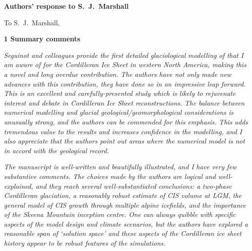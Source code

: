 


\textbf{Authors' response to S.~J.~Marshall}
\bigskip


\newcommand{\sechead}[1]{\bigskip\noindent\textbf{#1}}
\newcommand{\referee}[1]{\bigskip\textcolor{journalname}{\textit{#1}}}
\newcommand{\msquote}[1]{\begin{quote}\textit{#1}\end{quote}}

To S.~J.~Marshall,


\sechead{1 \quad Summary comments}

\referee{%
    Seguinot and colleagues provide the first detailed glaciological modelling
    of that I am aware of for the Cordilleran Ice Sheet in western North
    America, making this a novel and long overdue contribution. The authors
    have not only made new advances with this contribution, they have done so
    in an impressive leap forward. This is an excellent and carefully-presented
    study which is likely to rejuvenate interest and debate in Cordilleran Ice
    Sheet reconstructions. The balance between numerical modelling and glacial
    geological/geomorphological considerations is unusually strong, and the
    authors can be commended for this emphasis. This adds tremendous value to
    the results and increases confidence in the modelling, and I also
    appreciate that the authors point out areas where the numerical model is
    not in accord with the geological record.}

\referee{%
    The manuscript is well-written and beautifully illustrated, and I have very
    few substantive comments. The choices made by the authors are logical and
    well-explained, and they reach several well-substantiated conclusions: a
    two-phase Cordilleran glaciation, a reasonably robust estimate of CIS
    volume at LGM, the general model of CIS growth through multiple alpine
    icefields, and the importance of the Skeena Mountain inception centre. One
    can always quibble with specific aspects of the model design and climate
    scenarios, but the authors have explored a reasonable span of `solution
    space' and these aspects of the Cordilleran ice sheet history appear to be
    robust features of the simulations.}

